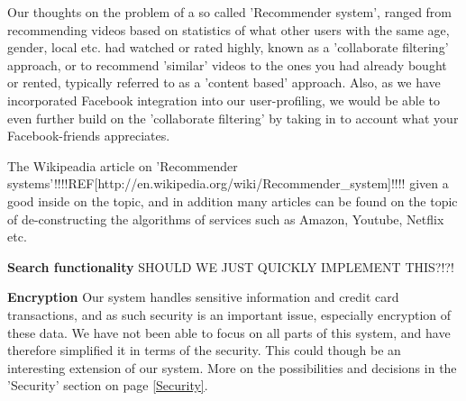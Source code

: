 Our thoughts on the problem of a so called 'Recommender system', ranged from recommending videos based on statistics of what other users with the same age, gender, local etc. had watched or rated highly, known as a 'collaborate filtering' approach, or to recommend 'similar' videos to the ones you had already bought or rented, typically referred to as a 'content based' approach. Also, as we have incorporated Facebook integration into our user-profiling, we would be able to even further build on the 'collaborate filtering' by taking in to account what your Facebook-friends appreciates. \

The Wikipeadia article on 'Recommender systems'!!!!REF[http://en.wikipedia.org/wiki/Recommender_system]!!!! given a good inside on the topic, and in addition many articles can be found on the topic of de-constructing the algorithms of services such as Amazon, Youtube, Netflix etc. \

\textbf{Search functionality}
SHOULD WE JUST QUICKLY IMPLEMENT THIS?!?!\

\textbf{Encryption}
Our system handles sensitive information and credit card transactions, and as such security is an important issue, especially encryption of these data. We have not been able to focus on all parts of this system, and have therefore simplified it in terms of the security. This could though be an interesting extension of our system. More on the possibilities and decisions in the 'Security' section on page \ref{Security}. \





 